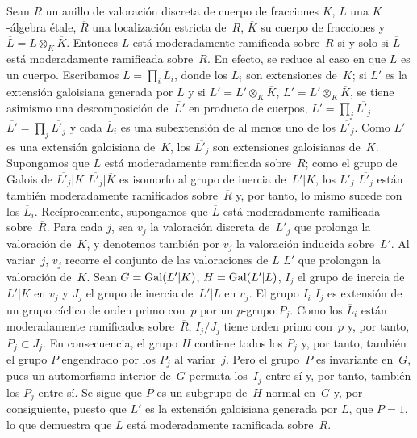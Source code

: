 \subsubsection{}
\label{XIII.2.0.2}
Sean $R$ un anillo de valoración discreta de cuerpo de fracciones $K$, $L$
una $K$-álgebra étale, $\overline{R}$ una localización estricta de~$R$,
$\overline{K}$ su cuerpo de fracciones y
$\overline{L}=L\otimes_K\overline{K}$. Entonces $L$ está moderadamente
ramificada sobre~$R$ si y solo si $\overline{L}$ está moderadamente
ramificada sobre~$\overline{R}$. En efecto, se reduce al caso en que $L$ es
un cuerpo. Escribamos $\overline{L}=\prod_i\overline{L}_i$, donde los
$\overline{L}_i$ son extensiones de~$\overline{K}$; si $L'$ es la
extensión galoisiana generada por $L$ y si
{$L'=L'\otimes_K\overline{K}$,}
{$\overline{L'}=L'\otimes_K\overline{K}$,}
se tiene asimismo una descomposición de~$\overline{L'}$ en producto de
cuerpos,
{$L'=\prod_j\overline{L'_j}$}
{$\overline{L'}=\prod_j\overline{L'_j}$}
y cada $\overline{L}_i$ es una subextensión de al menos uno de los
$\overline{L'_j}$. Como $L'$ es una extensión galoisiana de~$K$, los
$\overline{L'_j}$ son extensiones galoisianas de~$\overline{K}$. Supongamos
que $L$ está moderadamente ramificada sobre~$R$; como el grupo de Galois de
{$\overline{L'_j}|K$}
{$\overline{L'_j}|\overline{K}$}
es isomorfo al grupo de inercia de~$L'|K$, los
{$L'_j$}
{$\overline{L'_j}$}
están también moderadamente ramificados sobre~$\overline{R}$ y, por tanto,
lo mismo sucede con los $\overline{L}_i$. Recíprocamente, supongamos que
$\overline{L}$ está moderadamente ramificada sobre~$\overline{R}$. Para cada
$j$, sea $v_j$ la valoración discreta de~$\overline{L'_j}$ que prolonga la
valoración de~$\overline{K}$, y denotemos también por $v_j$ la valoración
inducida sobre~$L'$. Al variar~$j$, $v_j$ recorre el conjunto de las
valoraciones de
{$L$}
{$L'$}
que prolongan la valoración de~$K$. Sean $G=\operatorname{Gal}(L'|K)$,
$H=\operatorname{Gal}(L'|L)$, $I_j$ el grupo de inercia de~$L'|K$ en $v_j$ y $J_j$ el
grupo de inercia de~$L'|L$ en $v_j$. El grupo
{$I_i$}
{$I_j$}
es extensión de un grupo cíclico de orden primo con~$p$ por un $p$-grupo
$P_j$. Como los $\overline{L}_i$ están moderadamente ramificados
sobre~$\overline{R}$, $I_j/J_j$ tiene orden primo con~$p$ y, por tanto,
$P_j\subset J_j$. En consecuencia, el grupo $H$ contiene todos los $P_j$ y,
por tanto, también el grupo $P$ engendrado por
los $P_j$ al variar~$j$. Pero el grupo~$P$ es invariante en~$G$, pues un
automorfismo interior de~$G$ permuta los~$I_j$ entre sí y, por tanto, también
los $P_j$ entre sí. Se sigue que $P$ es un subgrupo de~$H$ normal en~$G$ y,
por consiguiente, puesto que $L'$ es la extensión galoisiana generada por
$L$, que $P=1$, lo que demuestra que $L$ está moderadamente ramificada
sobre~$R$.

